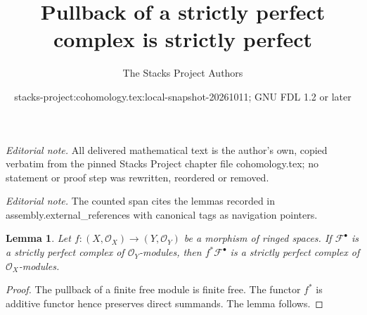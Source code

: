 \documentclass[10pt,a4paper]{amsart}
\title{Pullback of a strictly perfect complex is strictly perfect}
\author{The Stacks Project Authors}
\date{stacks-project:cohomology.tex:local-snapshot-20261011; GNU FDL 1.2 or later}
\theoremstyle{plain}
\newtheorem{lemma}[subsection]{Lemma}
\theoremstyle{definition}
\theoremstyle{remark}
\numberwithin{equation}{subsection}
\begin{document}
\maketitle
\noindent\textit{Editorial note.} All delivered mathematical text is the author's own, copied verbatim from the pinned Stacks Project chapter file cohomology.tex; no statement or proof step was rewritten, reordered or removed.\par\medskip
\noindent\textit{Editorial note.} The counted span cites the lemmas recorded in assembly.external\_references with canonical tags as navigation pointers.\par\medskip
\begin{lemma}
\label{lemma-strictly-perfect-pullback}
Let $f : (X, \mathcal{O}_X) \to (Y, \mathcal{O}_Y)$
be a morphism of ringed spaces. If $\mathcal{F}^\bullet$ is a strictly
perfect complex of $\mathcal{O}_Y$-modules, then
$f^*\mathcal{F}^\bullet$ is a strictly perfect complex of
$\mathcal{O}_X$-modules.
\end{lemma}

\begin{proof}
The pullback of a finite free module is finite free. The functor
$f^*$ is additive functor hence preserves direct summands. The lemma follows.
\end{proof}
\end{document}
